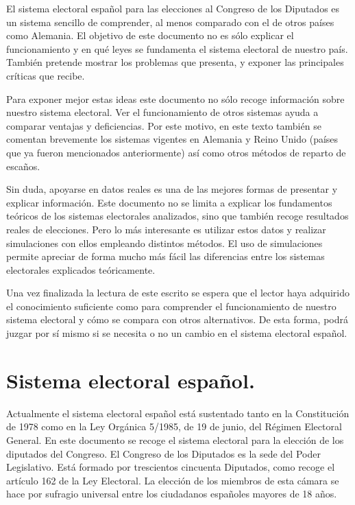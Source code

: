 \documentclass[11pt]{article}
\begin{document}
	El sistema electoral español para las elecciones al Congreso de los Diputados es un sistema sencillo de comprender, al menos comparado con el de otros países como Alemania. El objetivo de este documento no es sólo explicar el funcionamiento y en qué leyes se fundamenta el sistema electoral de nuestro país. También pretende mostrar los problemas que presenta, y exponer las principales críticas que recibe. 
	
	Para exponer mejor estas ideas este documento no sólo recoge información sobre nuestro sistema electoral. Ver el funcionamiento de otros sistemas ayuda a comparar ventajas y deficiencias. Por este motivo, en este texto también se comentan brevemente los sistemas vigentes en Alemania y Reino Unido (países que ya fueron mencionados anteriormente) así como otros métodos de reparto de escaños.
	
	Sin duda, apoyarse en datos reales es una de las mejores formas de presentar y explicar información. Este documento no se limita a explicar los fundamentos teóricos de los sistemas electorales analizados, sino que también recoge resultados reales de elecciones. Pero lo más interesante es utilizar estos datos y realizar simulaciones con ellos empleando distintos métodos. El uso de simulaciones permite apreciar de forma mucho más fácil las diferencias entre los sistemas electorales explicados teóricamente.
	
	Una vez finalizada la lectura de este escrito se espera que el lector haya adquirido el conocimiento suficiente como para comprender el funcionamiento de nuestro sistema electoral y cómo se compara con otros alternativos. De esta forma, podrá juzgar por sí mismo si se necesita o no un cambio en el sistema electoral español.
		
	\newpage
	
	\section{Sistema electoral español.}
	
	Actualmente el sistema electoral español está sustentado tanto en la Constitución de 1978 como en la Ley Orgánica 5/1985, de 19 de junio, del Régimen Electoral General. En este documento se recoge el sistema electoral para la elección de los diputados del Congreso. El Congreso de los Diputados es la sede del Poder Legislativo. Está formado por trescientos cincuenta Diputados, como recoge el artículo 162 de la Ley Electoral. La elección de los miembros de esta cámara se hace por sufragio universal entre los ciudadanos españoles mayores de 18 años.
	
\end{document}
